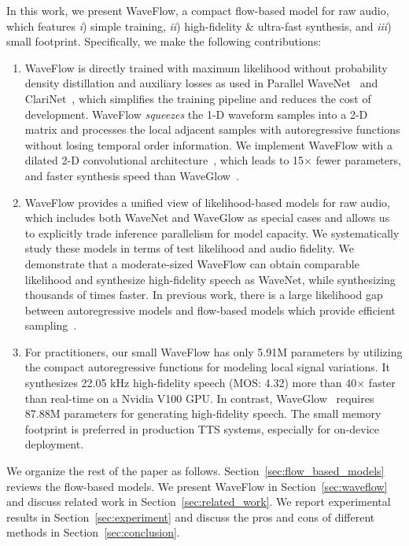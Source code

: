 \documentclass{article}
\begin{document}
In this work, we present WaveFlow, a compact flow-based model for raw audio, which features \emph{i}) simple training, \emph{ii}) high-fidelity \& ultra-fast synthesis, and \emph{iii}) small footprint. 
Specifically, we make the following contributions:
\vspace{-0.3em}
\begin{enumerate}[itemsep=-0.00pt, topsep=0pt, leftmargin=1.5em]
    \item WaveFlow is directly trained with maximum likelihood without probability density distillation and auxiliary losses as used in Parallel WaveNet~\citep{oord2017parallel} and ClariNet~\citep{ping2018clarinet}, which simplifies the training pipeline and reduces the cost of development.
     WaveFlow \emph{squeezes} the 1-D waveform samples into a 2-D matrix and processes the local adjacent samples with autoregressive functions without losing temporal order information.
    We implement WaveFlow with a dilated 2-D convolutional architecture~\citep{yu2015multi}, which leads to 15$\times$ fewer parameters, and faster synthesis speed than WaveGlow~\citep{prenger2019waveglow}. 
    \vspace{-.04cm}
    \item  WaveFlow provides a unified view of likelihood-based models for raw audio, which includes both WaveNet and WaveGlow as special cases and allows us to explicitly trade inference parallelism for model capacity.
    We systematically study these models in terms of test likelihood and audio fidelity.
    We demonstrate that a moderate-sized WaveFlow can obtain comparable likelihood and synthesize high-fidelity speech as  WaveNet, while synthesizing thousands of times faster. 
    In previous work, there is a large likelihood gap between autoregressive models and flow-based models which provide efficient sampling~\citep{ho2019flow++, tran2019discrete}.
    \vspace{-.04cm}
    \item  For practitioners, our small WaveFlow has only 5.91M parameters by utilizing the compact autoregressive functions for modeling local signal variations. It synthesizes 22.05 kHz high-fidelity speech (MOS: 4.32) more than 40$\times$ faster than real-time on a Nvidia V100 GPU. 
    In contrast, WaveGlow~\citep{prenger2019waveglow} requires  87.88M parameters for generating high-fidelity speech. 
    The small memory footprint is preferred in production TTS systems, especially for on-device deployment.
\vspace{-.2em}
\end{enumerate}
We organize the rest of the paper as follows. 
Section~\ref{sec:flow_based_models} reviews the flow-based models.
We present WaveFlow in Section~\ref{sec:waveflow} and discuss related work in Section~\ref{sec:related_work}.
We report experimental results in Section~\ref{sec:experiment} and discuss the pros and cons of different methods in Section~\ref{sec:conclusion}.
\end{document}
